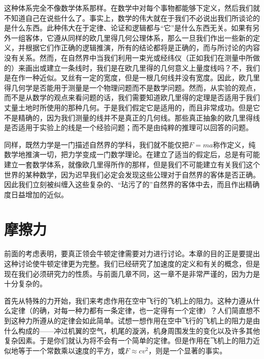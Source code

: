 这种体系完全不像数学体系那样。在数学中对每个事物都能够下定义，然后我们就不知道自己在说些什么了。事实上，数学的伟大就在于我们不必说出我们所谈论的是什么东西。此种伟大在于定律、论证和逻辑都与“它”是什么东西无关。如果有另外一组客体，它遵从同样的欧几里得几何公理体系，那么一旦我们作出一些新的定义，并根据它们作正确的逻辑推演，所有的结论都将是正确的，而与所讨论的内容没有关系。然而，在自然界中当我们利用一束光或经纬仪（正如我们在测量中所做的）来画出或建立一条线时，我们是在欧几里得的几何意义上量度线吗？不，我们是在作一种近似。叉丝有一定的宽度，但是一根几何线并没有宽度。因此，欧几里得几何学是否能用于测量是一个物理问题而不是数学问题。然而，从实验的观点，而不是从数学的观点来看问题的话，我们需要知道欧几里得的定理是否适用于我们丈量土地时所使用的那种几何。于是我们假定它是适用的，而且非常成功。但是它不是精确的，因为我们测量的线并不是真正的几何线。那些真正抽象的欧几里得线是否适用于实验上的线是一个经验问题；而不是由纯粹的推理可以回答的问题。

同样，既然力学是一门描述自然界的学科，我们就不能仅把$F=ma$称作定义，纯数学地推演一切，把力学变成一门数学理论。在建立了适当的假定后，总是有可能建立一套数学体系，就像欧几里得所作的那样，但是我们不可能建立有关我们这个世界的某种数学，因为迟早我们必定会发现这些公理对于自然界的客体是否正确。因此我们立刻被纠缠入这些复杂的、“玷污了的”自然界的客体中去，而且作出精确度日益增加的近似。

\section{摩擦力}

前面的考虑表明，要真正领会牛顿定律需要对力进行讨论。本章的目的正是要提出这种讨论使牛顿定律更为完整。我们已经研究了加速度的定义和有关的概念，但是现在我们必须研究力的性质。与前面几章不同，这一章不是非常严谨的，因为力是十分复杂的。

首先从特殊的力开始，我们来考虑作用在空中飞行的飞机上的阻力。这种力遵从什么定律（的确，对每一种力都有一条定律，也一定得有一个定律）？人们简直想不到这种力所遵从的定律会如此简单。试想一想作用在空中飞行的飞机上的阻力是由什么构成的——冲过机翼的空气，机尾的漩涡，机身周围发生的变化以及许多其他复杂因素。于是你们就认为将不会有一个简单的定律。但是作用在飞机上的阻力近似地等于一个常数乘以速度的平方，或$F\approx cv^2$，则是一个显著的事实。

